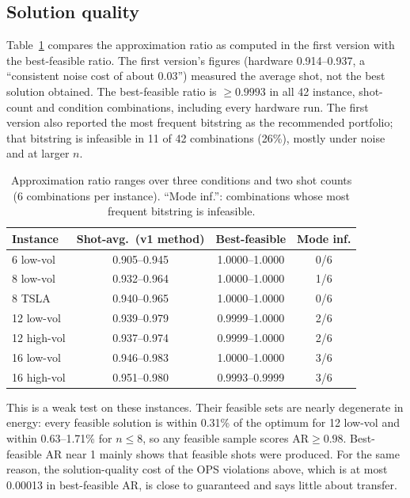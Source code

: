 \documentclass[conference]{IEEEtran}
\newcommand{\AR}{\mathrm{AR}}
\begin{document}
\subsection{Solution quality}
\label{sec:ar}

Table~\ref{tab:ar} compares the approximation ratio as computed in the
first version with the best-feasible ratio. The first version's figures
(hardware 0.914--0.937, a ``consistent noise cost of about 0.03'')
measured the average shot, not the best solution obtained. The
best-feasible ratio is $\geq0.9993$ in all 42 instance, shot-count and
condition combinations, including every hardware run. The first
version also reported the most frequent bitstring as the recommended
portfolio; that bitstring is infeasible in 11 of 42 combinations (26\%),
mostly under noise and at larger $n$.

\begin{table}[htbp]
\caption{Approximation ratio ranges over three conditions and two shot
counts (6 combinations per instance). ``Mode inf.'': combinations whose
most frequent bitstring is infeasible.}
\label{tab:ar}
\begin{center}
\begin{tabular}{@{}lccc@{}}
\toprule
\textbf{Instance} & \textbf{Shot-avg.\ (v1 method)} & \textbf{Best-feasible} & \textbf{Mode inf.} \\
\midrule
6 low-vol   & 0.905--0.945 & 1.0000--1.0000 & 0/6 \\
8 low-vol   & 0.932--0.964 & 1.0000--1.0000 & 1/6 \\
8 TSLA      & 0.940--0.965 & 1.0000--1.0000 & 0/6 \\
12 low-vol  & 0.939--0.979 & 0.9999--1.0000 & 2/6 \\
12 high-vol & 0.937--0.974 & 0.9999--1.0000 & 2/6 \\
16 low-vol  & 0.946--0.983 & 1.0000--1.0000 & 3/6 \\
16 high-vol & 0.951--0.980 & 0.9993--0.9999 & 3/6 \\
\bottomrule
\end{tabular}
\end{center}
\end{table}

This is a weak test on these instances. Their feasible sets are nearly
degenerate in energy: every feasible solution is within 0.31\% of the
optimum for 12 low-vol and within 0.63--1.71\% for $n{\le}8$, so any
feasible sample scores $\AR\geq0.98$. Best-feasible
AR near 1 mainly shows that feasible shots were produced. For the same
reason, the solution-quality cost of the OPS violations above, which
is at most 0.00013 in best-feasible AR, is close to guaranteed and says
little about transfer.
\end{document}
